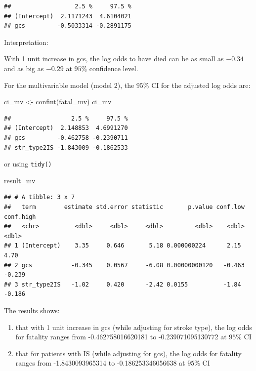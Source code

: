 \documentclass[
]{book}
\makeatletter
\newenvironment{Shaded}{\begin{snugshade}}{\end{snugshade}}
\newcommand{\FunctionTok}[1]{\textcolor[rgb]{0,0,0}{#1}}
\newcommand{\NormalTok}[1]{#1}
\newcommand{\OtherTok}[1]{\textcolor[rgb]{0.37,0.37,0.37}{#1}}
\providecommand{\tightlist}{%
  \setlength{\itemsep}{0pt}\setlength{\parskip}{0pt}}
\newenvironment{kframe}{%
\medskip{}
\setlength{\fboxsep}{.8em}
 \def\at@end@of@kframe{}%
 \ifinner\ifhmode%
  \def\at@end@of@kframe{\end{minipage}}%
  \begin{minipage}{\columnwidth}%
 \fi\fi%
 \def\FrameCommand##1{\hskip\@totalleftmargin \hskip-\fboxsep
 \colorbox{shadecolor}{##1}\hskip-\fboxsep
     \hskip-\linewidth \hskip-\@totalleftmargin \hskip\columnwidth}%
 \MakeFramed {\advance\hsize-\width
   \@totalleftmargin\z@ \linewidth\hsize
   \@setminipage}}%
 {\par\unskip\endMakeFramed%
 \at@end@of@kframe}
\renewenvironment{Shaded}{\begin{kframe}}{\end{kframe}}
\makeatother
\begin{document}
\begin{verbatim}
##                  2.5 %     97.5 %
## (Intercept)  2.1171243  4.6104021
## gcs         -0.5033314 -0.2891175
\end{verbatim}

Interpretation:

With 1 unit increase in gcs, the log odds to have died can be as small as \(-0.34\) and as big as \(-0.29\) at \(95\%\) confidence level.

For the multivariable model (model 2), the \(95\%\) CI for the adjusted log odds are:

\begin{Shaded}
\begin{Highlighting}[]
\NormalTok{ci\_mv }\OtherTok{\textless{}{-}} \FunctionTok{confint}\NormalTok{(fatal\_mv)}
\NormalTok{ci\_mv}
\end{Highlighting}
\end{Shaded}

\begin{verbatim}
##                 2.5 %     97.5 %
## (Intercept)  2.148853  4.6991270
## gcs         -0.462758 -0.2390711
## str_type2IS -1.843009 -0.1862533
\end{verbatim}

or using \texttt{tidy()}

\begin{Shaded}
\begin{Highlighting}[]
\NormalTok{result\_mv}
\end{Highlighting}
\end{Shaded}

\begin{verbatim}
## # A tibble: 3 x 7
##   term        estimate std.error statistic       p.value conf.low conf.high
##   <chr>          <dbl>     <dbl>     <dbl>         <dbl>    <dbl>     <dbl>
## 1 (Intercept)    3.35     0.646       5.18 0.000000224      2.15      4.70 
## 2 gcs           -0.345    0.0567     -6.08 0.00000000120   -0.463    -0.239
## 3 str_type2IS   -1.02     0.420      -2.42 0.0155          -1.84     -0.186
\end{verbatim}

The results shows:

\begin{enumerate}
\def\labelenumi{\arabic{enumi}.}
\tightlist
\item
  that with 1 unit increase in gcs (while adjusting for stroke type), the log odds for fatality ranges from -0.462758016620181 to -0.239071095130772 at \(95\%\) CI
\item
  that for patients with IS (while adjusting for gcs), the log odds for fatality ranges from -1.8430093965314 to -0.186253346056638 at \(95\%\) CI
\end{enumerate}
\end{document}
